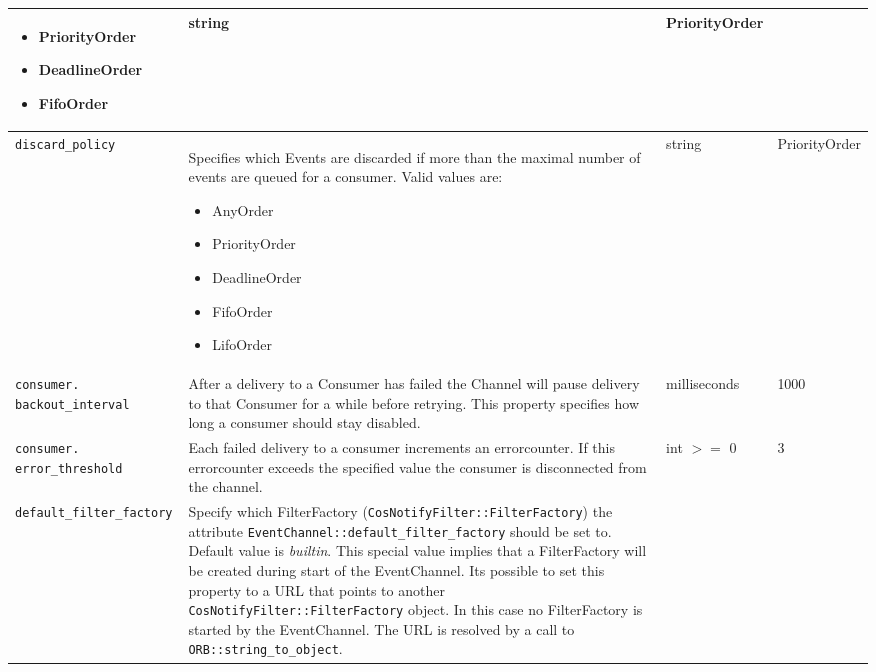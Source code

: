 \begin{small}
\begin{longtable}{|p{5cm}|p{7.5cm}|p{1.5cm}|p{1.5cm}|}
\begin{itemize}
    \item PriorityOrder

    \item DeadlineOrder

    \item FifoOrder
    \end{itemize} & 

    string & Priority\-Order \\ \hline

    \verb"discard_policy" &

    Specifies which Events are discarded if more than the  
    maximal number of events are queued for a consumer. 
    Valid values are:
    \begin{itemize}
    \item AnyOrder

    \item PriorityOrder

    \item DeadlineOrder

    \item FifoOrder

    \item LifoOrder
    \end{itemize} &

    string & Priority\-Order \\ \hline
       
    \verb"consumer."
    \verb"backout_interval" &

    After a delivery to a Consumer has failed the Channel will pause
    delivery to that Consumer for a while before retrying. This property
    specifies how long a consumer should stay disabled. &

    milli\-seconds & 1000 \\ \hline

    \verb"consumer."
    \verb"error_threshold" &

    Each failed delivery to a consumer increments an errorcounter. If this
    errorcounter exceeds the specified value the consumer is
    disconnected from the channel. &

    int $>=$ 0 & 3 \\ \hline

    \verb"default_filter_factory" &

    Specify which FilterFactory (\texttt{CosNotifyFilter::FilterFactory}) the
    attribute \texttt{EventChannel::\-default\_filter\_factory} should be set to. 
    Default value is \emph{builtin}. This special value implies that a
    FilterFactory will be created during start of the EventChannel.
    Its possible to set this property to a URL that points to another
    \texttt{CosNotifyFilter::FilterFactory} object. In this case no FilterFactory
    is started by the EventChannel. The URL is resolved by a call
    to \texttt{ORB::string\_to\_object}. &


\end{longtable}
\end{small}
